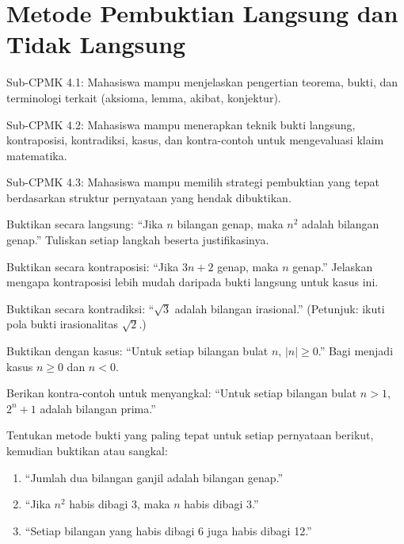 \documentclass[../main]{subfiles}
\begin{document}
\chapter{Metode Pembuktian Langsung dan Tidak Langsung}

\begin{subcpmk}
  \item Sub-CPMK 4.1: Mahasiswa mampu menjelaskan pengertian teorema, bukti, dan terminologi terkait (aksioma, lemma, akibat, konjektur).
  \item Sub-CPMK 4.2: Mahasiswa mampu menerapkan teknik bukti langsung, kontraposisi, kontradiksi, kasus, dan kontra-contoh untuk mengevaluasi klaim matematika.
  \item Sub-CPMK 4.3: Mahasiswa mampu memilih strategi pembuktian yang tepat berdasarkan struktur pernyataan yang hendak dibuktikan.
\end{subcpmk}










\begin{aktivitas}
  \item Buktikan secara langsung: ``Jika $n$ bilangan genap, maka $n^2$ adalah bilangan genap.'' Tuliskan setiap langkah beserta justifikasinya.
  \item Buktikan secara kontraposisi: ``Jika $3n + 2$ genap, maka $n$ genap.'' Jelaskan mengapa kontraposisi lebih mudah daripada bukti langsung untuk kasus ini.
  \item Buktikan secara kontradiksi: ``$\sqrt{3}$ adalah bilangan irasional.'' (Petunjuk: ikuti pola bukti irasionalitas $\sqrt{2}$.)
  \item Buktikan dengan kasus: ``Untuk setiap bilangan bulat $n$, $|n| \geq 0$.'' Bagi menjadi kasus $n \geq 0$ dan $n < 0$.
  \item Berikan kontra-contoh untuk menyangkal: ``Untuk setiap bilangan bulat $n > 1$, $2^n + 1$ adalah bilangan prima.''
  \item Tentukan metode bukti yang paling tepat untuk setiap pernyataan berikut, kemudian buktikan atau sangkal:
  \begin{enumerate}
    \item ``Jumlah dua bilangan ganjil adalah bilangan genap.''
    \item ``Jika $n^2$ habis dibagi 3, maka $n$ habis dibagi 3.''
    \item ``Setiap bilangan yang habis dibagi 6 juga habis dibagi 12.''
  \end{enumerate}
\end{aktivitas}
\end{document}

